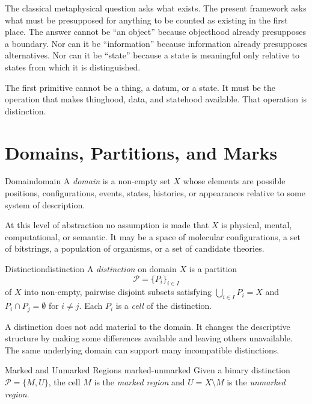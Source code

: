 \documentclass[12pt,twoside,openright]{book}
\newcommand{\partition}{\mathcal{P}}
\begin{document}
The classical metaphysical question asks what exists. The
present framework asks what must be presupposed for anything
to be counted as existing in the first place. The answer
cannot be ``an object'' because objecthood already
presupposes a boundary. Nor can it be ``information''
because information already presupposes alternatives. Nor
can it be ``state'' because a state is meaningful only
relative to states from which it is distinguished.

The first primitive cannot be a thing, a datum, or a state.
It must be the operation that makes thinghood, data, and
statehood available. That operation is distinction.

\section{Domains, Partitions, and Marks}
\label{sec:ch1-domain}

\begin{definition}{Domain}{domain}
  A \emph{domain} is a non-empty set $X$ whose elements
  are possible positions, configurations, events, states,
  histories, or appearances relative to some system of
  description. 
\end{definition}

At this level of abstraction no assumption is made that
$X$ is physical, mental, computational, or semantic.
It may be a space of molecular configurations, a set of
bitstrings, a population of organisms, or a set of
candidate theories.

\begin{definition}{Distinction}{distinction}
  A \emph{distinction} on domain $X$ is a partition
  \[
    \partition = \{P_i\}_{i \in I}
  \]
  of $X$ into non-empty, pairwise disjoint subsets
  satisfying $\bigcup_{i \in I} P_i = X$ and
  $P_i \cap P_j = \emptyset$ for $i \ne j$.
  Each $P_i$ is a \emph{cell} of the distinction.
\end{definition}

A distinction does not add material to the domain. It
changes the descriptive structure by making some
differences available and leaving others unavailable.
The same underlying domain can support many incompatible
distinctions.

\begin{definition}{Marked and Unmarked Regions}%
  {marked-unmarked}
  Given a binary distinction $\partition = \{M, U\}$,
  the cell $M$ is the \emph{marked region} and
  $U = X \setminus M$ is the \emph{unmarked region}.
\end{definition}
\end{document}
